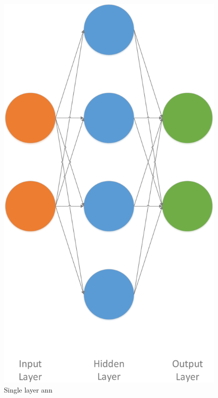 \begin{figure}[!ht]
	\centering
	\begin{minipage}[b]{0.4\textwidth}
		\includegraphics[width=\textwidth]{img/ann_1h}
		\caption{Single layer \gls{ann}}
		\label{fig:ann_1h}
	\end{minipage}
	\hfill
	\begin{minipage}[b]{0.5\textwidth}

\end{minipage}
\end{figure}
